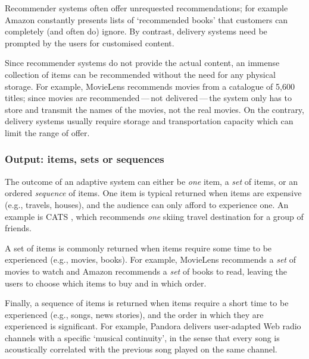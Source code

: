 Recommender systems often offer unrequested recommendations; for example Amazon constantly presents lists of `recommended books' that customers can completely (and often do) ignore.
By contrast, delivery systems need be prompted by the users for customised content. %

Since recommender systems do not provide the actual content, an immense collection of items can be recommended without the need for any physical storage. 
For example, MovieLens \cite{Cosley03} recommends movies from a catalogue of 5,600 titles; since movies are recommended\,---\,not delivered\,---\,the system only has to store and transmit the names of the movies, not the real movies.
On the contrary, delivery systems usually require storage and transportation capacity which can limit the range of offer.


\subsubsection{Output: items, sets or sequences} %
\label{ssub:adaptation_size_and_output}

The outcome of an adaptive system can either be \emph{one} item, a \emph{set} of items, or an ordered \emph{sequence} of items.
%
One item is typical returned when items are expensive (e.g., travels, houses), and the audience can only afford to experience one. 
An example is CATS \cite{McCarthy06b}, which recommends \emph{one} skiing travel destination for a group of friends.

A set of items is commonly returned when items require some time to be experienced (e.g., movies, books). %
For example, MovieLens recommends a \emph{set} of movies to watch and Amazon recommends a \emph{set} of books to read, leaving the users to choose which items to buy and in which order. 

Finally, a sequence of items is returned when items require a short time to be experienced (e.g., songs, news stories), and the order in which they are experienced is significant. 
For example, Pandora delivers user-adapted Web radio channels with a specific `musical continuity', in the sense that every song is acoustically correlated with the previous song played on the same channel.


